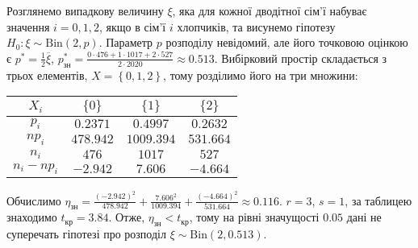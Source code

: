 \begin{example}
\begin{enumerate}
            Розглянемо випадкову величину $\xi$, яка для кожної дводітної сім'ї набуває значення $i = 0, 1, 2$, якщо в сім'ї $i$ хлопчиків,
            та висунемо гіпотезу $H_0: \xi \sim \mathrm{Bin}(2, p)$. Параметр $p$ розподілу невідомий, але його точковою оцінкою є
            $p^* = \frac{1}{2} \overline{\xi}$, $p^*_{\text{зн}} = \frac{0\cdot 476 + 1\cdot 1017 + 2\cdot 527}{2\cdot 2020} \approx 0.513$.
            Вибірковий простір складається з трьох елементів, $X = \left\{0, 1, 2 \right\}$, тому розділимо його на три множини:
            \begin{center}
                \begin{tabular}{|c|c|c|c|}
                    \hline
                    $X_i$ & $\{0\}$ & $\{1\}$ & $\{2\}$ \\
                    \hline
                    $p_i$ & $0.2371$ & $0.4997$ & $0.2632$ \\
                    \hline
                    $n p_i$ & $478.942$ & $1009.394$ & $531.664$ \\
                    \hline
                    $n_i$ & $476$ & $1017$ & $527$ \\
                    \hline
                    $n_i - np_i$ & $-2.942$ & $7.606$ & $-4.664$ \\
                    \hline
                \end{tabular}
            \end{center}
            Обчислимо $\eta_{\text{зн}} = \frac{(-2.942)^2}{478.942} + \frac{7.606^2}{1009.394} + \frac{(-4.664)^2}{531.664} \approx 0.116$.
            $r = 3$, $s=1$, за таблицею знаходимо $t_{\text{кр}} = 3.84$.
            Отже, $\eta_{\text{зн}} < t_{\text{кр}}$, тому на рівні значущості $0.05$ дані не суперечать гіпотезі про розподіл $\xi \sim \mathrm{Bin}(2, 0.513)$.
    \end{enumerate}
\end{example}

